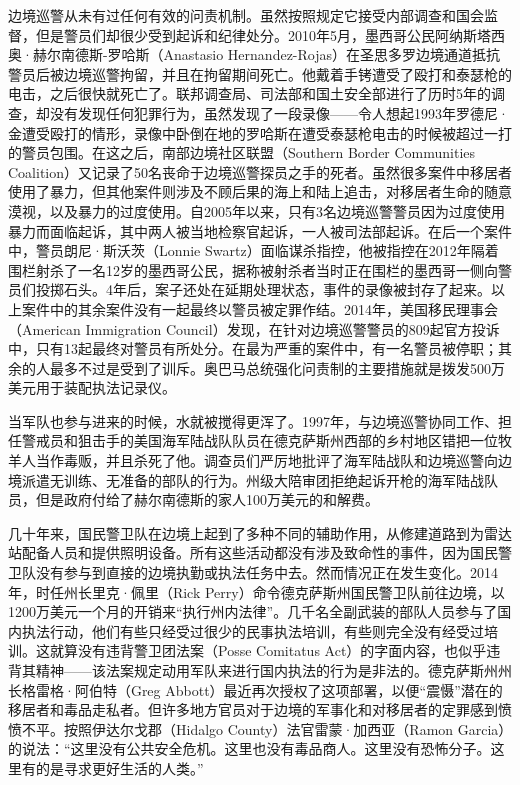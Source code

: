 \documentclass[fontset=fandol, a4paper, 12pt, openright]{ctexbook}
\begin{document}
边境巡警从未有过任何有效的问责机制。虽然按照规定它接受内部调查和国会监督，但是警员们却很少受到起诉和纪律处分。2010年5月，墨西哥公民阿纳斯塔西奥·赫尔南德斯-罗哈斯（Anastasio Hernandez-Rojas）在圣思多罗边境通道抵抗警员后被边境巡警拘留，并且在拘留期间死亡。他戴着手铐遭受了殴打和泰瑟枪的电击，之后很快就死亡了。联邦调查局、司法部和国土安全部进行了历时5年的调查，却没有发现任何犯罪行为，虽然发现了一段录像——令人想起1993年罗德尼·金遭受殴打的情形，录像中卧倒在地的罗哈斯在遭受泰瑟枪电击的时候被超过一打的警员包围。在这之后，南部边境社区联盟（Southern Border Communities Coalition）又记录了50名丧命于边境巡警探员之手的死者。虽然很多案件中移居者使用了暴力，但其他案件则涉及不顾后果的海上和陆上追击，对移居者生命的随意漠视，以及暴力的过度使用。自2005年以来，只有3名边境巡警警员因为过度使用暴力而面临起诉，其中两人被当地检察官起诉，一人被司法部起诉。在后一个案件中，警员朗尼·斯沃茨（Lonnie Swartz）面临谋杀指控，他被指控在2012年隔着围栏射杀了一名12岁的墨西哥公民，据称被射杀者当时正在围栏的墨西哥一侧向警员们投掷石头。4年后，案子还处在延期处理状态，事件的录像被封存了起来。以上案件中的其余案件没有一起最终以警员被定罪作结。2014年，美国移民理事会（American Immigration Council）发现，在针对边境巡警警员的809起官方投诉中，只有13起最终对警员有所处分。在最为严重的案件中，有一名警员被停职；其余的人最多不过是受到了训斥。奥巴马总统强化问责制的主要措施就是拨发500万美元用于装配执法记录仪。

当军队也参与进来的时候，水就被搅得更浑了。1997年，与边境巡警协同工作、担任警戒员和狙击手的美国海军陆战队队员在德克萨斯州西部的乡村地区错把一位牧羊人当作毒贩，并且杀死了他。调查员们严厉地批评了海军陆战队和边境巡警向边境派遣无训练、无准备的部队的行为。州级大陪审团拒绝起诉开枪的海军陆战队员，但是政府付给了赫尔南德斯的家人100万美元的和解费。

几十年来，国民警卫队在边境上起到了多种不同的辅助作用，从修建道路到为雷达站配备人员和提供照明设备。所有这些活动都没有涉及致命性的事件，因为国民警卫队没有参与到直接的边境执勤或执法任务中去。然而情况正在发生变化。2014年，时任州长里克·佩里（Rick Perry）命令德克萨斯州国民警卫队前往边境，以1200万美元一个月的开销来“执行州内法律”。几千名全副武装的部队人员参与了国内执法行动，他们有些只经受过很少的民事执法培训，有些则完全没有经受过培训。这就算没有违背警卫团法案（Posse Comitatus Act）的字面内容，也似乎违背其精神——该法案规定动用军队来进行国内执法的行为是非法的。德克萨斯州州长格雷格·阿伯特（Greg Abbott）最近再次授权了这项部署，以便“震慑”潜在的移居者和毒品走私者。但许多地方官员对于边境的军事化和对移居者的定罪感到愤愤不平。按照伊达尔戈郡（Hidalgo County）法官雷蒙·加西亚（Ramon Garcia）的说法：“这里没有公共安全危机。这里也没有毒品商人。这里没有恐怖分子。这里有的是寻求更好生活的人类。”
\end{document}
